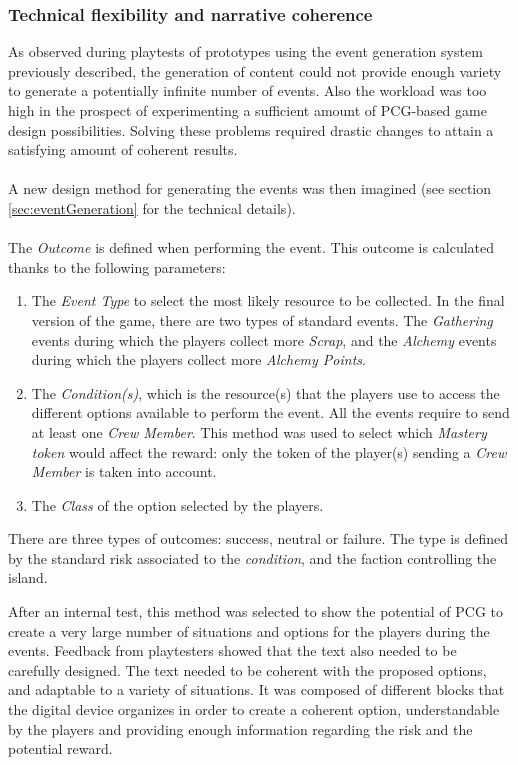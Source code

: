 \subsubsection{Technical flexibility and narrative coherence}
As observed during playtests of prototypes using the event generation system previously described, the generation of content could not provide enough variety to generate a potentially infinite number of events. Also the workload was too high in the prospect of experimenting a sufficient amount of PCG-based game design possibilities. Solving these problems required drastic changes to attain a satisfying amount of coherent results.\\\\
A new design method for generating the events was then imagined (see section \ref{sec:eventGeneration} for the technical details).\\\\
The \textit{Outcome} is defined when performing the event. This outcome is calculated thanks to the following parameters:
\begin{enumerate}
\item The \textit{Event Type} to select the most likely resource to be collected. In the final version of the game, there are two types of standard events. The \textit{Gathering} events during which the players collect more \textit{Scrap}, and the \textit{Alchemy} events during which the players collect more \textit{Alchemy Points}.
\item The \textit{Condition(s)}, which is the resource(s) that the players use to access the different options available to perform the event. All the events require to send at least one \textit{Crew Member}. This method was used to select which \textit{Mastery token} would affect the reward: only the token of the player(s) sending a \textit{Crew Member} is taken into account.
\item The \textit{Class} of the option selected by the players. 
\end{enumerate}
There are three types of outcomes: success, neutral or failure. The type is defined by the standard risk associated to the \textit{condition}, and the faction controlling the island. 

After an internal test, this method was selected to show the potential of PCG to create a very large number of situations and options for the players during the events. Feedback from playtesters showed that the text also needed to be carefully designed. The text needed to be coherent with the proposed options, and adaptable to a variety of situations. It was composed of different blocks that the digital device organizes in order to create a coherent option, understandable by the players and providing enough information regarding the risk and the potential reward.

